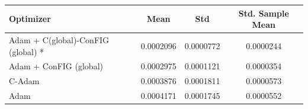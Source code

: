 \begin{table}[H]
    \centering
    \label{tab:optimizer_results}
    \begin{tabular}{lccc}
        \toprule
        \textbf{Optimizer} & \textbf{Mean} & \textbf{Std} & \textbf{Std. Sample Mean} \\
        \midrule
        Adam + C(global)-ConFIG (global) * & 0.0002096 & 0.0000772 & 0.0000244 \\
        Adam + ConFIG (global) & 0.0002975 & 0.0001121 & 0.0000354 \\
        C-Adam & 0.0003876 & 0.0001811 & 0.0000573 \\
        Adam & 0.0004171 & 0.0001745 & 0.0000552 \\
        \bottomrule
    \end{tabular}
\end{table}
